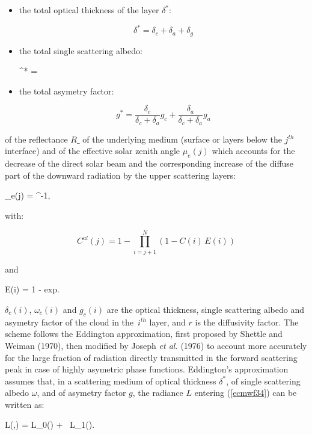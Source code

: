 \begin{itemize}
\item{the total optical thickness of the layer $\delta^{*}$:}

\[
\delta^{*} = \delta_c + \delta_a + \delta_g
\]

\item{the total single scattering albedo:}

\be
\omega^{*} = 
\label{ecmwf314}
\ee

\item{the total asymetry factor:}

\[
g^{*} = \frac{\delta_c}{\delta_c + \delta_a} g_c + \frac{\delta_a}{\delta_c + \delta_a} g_a
\]
\end{itemize}


\noindent of the reflectance $R\_$ of the underlying medium (surface or layers
below the $j^{th}$ interface) and of the effective solar zenith angle $\mu_e(j)$
which accounts for the decrease of the direct solar beam and the corresponding
increase of the diffuse part of the downward radiation by the upper scattering
layers:

\medskip
\be
\mu_e(j) = ^{-1},
\label{ecmwf315}
\ee

\noindent with:

\[
C^{al}(j) = 1 - \prod_{i=j+1}^N{(1 - C(i) \, E(i))}
\]

\noindent and

\be
E(i) = 1 - exp.
\label{ecmwf316}
\ee
\medskip

$\delta_c(i)$, $\omega_c(i)$ and $g_c(i)$ are the optical thickness, single scattering albedo and asymetry factor of the cloud in the $\, i^{th}$ layer, and $r$ is the diffusivity factor. The scheme follows the Eddington approximation, first proposed by Shettle and Weiman (1970), then modified by Joseph {\em et al.} (1976) to account more accurately for the large fraction of radiation directly transmitted in the forward scattering peak in case of highly asymetric phase functions. Eddington's approximation assumes that, in a scattering medium of optical thickness $\delta^{*}$, of single scattering albedo $\omega$, and of asymetry factor $g$, the radiance $L$ entering (\ref{ecmwf34}) can be written as:

\medskip
\be
L(\delta,\mu) = L_0(\delta) + \mu \, L_1(\delta).
\label{ecmwf317}
\ee
\medskip

